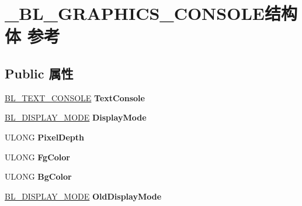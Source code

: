 \hypertarget{struct___b_l___g_r_a_p_h_i_c_s___c_o_n_s_o_l_e}{}\section{\+\_\+\+B\+L\+\_\+\+G\+R\+A\+P\+H\+I\+C\+S\+\_\+\+C\+O\+N\+S\+O\+L\+E结构体 参考}
\label{struct___b_l___g_r_a_p_h_i_c_s___c_o_n_s_o_l_e}
\subsection*{Public 属性}
\begin{DoxyCompactItemize}
\item 
\mbox{\label{struct___b_l___g_r_a_p_h_i_c_s___c_o_n_s_o_l_e_ad3e28a0970e0eb4021a84583652054cf}} 
\hyperlink{struct___b_l___t_e_x_t___c_o_n_s_o_l_e}{B\+L\+\_\+\+T\+E\+X\+T\+\_\+\+C\+O\+N\+S\+O\+LE} {\bfseries Text\+Console}
\item 
\mbox{\label{struct___b_l___g_r_a_p_h_i_c_s___c_o_n_s_o_l_e_ab17e5e54b0e17643a6024297a1b0a357}} 
\hyperlink{struct___b_l___d_i_s_p_l_a_y___m_o_d_e}{B\+L\+\_\+\+D\+I\+S\+P\+L\+A\+Y\+\_\+\+M\+O\+DE} {\bfseries Display\+Mode}
\item 
\mbox{\label{struct___b_l___g_r_a_p_h_i_c_s___c_o_n_s_o_l_e_ac15ce61adaae7df004f04d15349f134b}} 
U\+L\+O\+NG {\bfseries Pixel\+Depth}
\item 
\mbox{\label{struct___b_l___g_r_a_p_h_i_c_s___c_o_n_s_o_l_e_a21d3267d0b39e3cbce8ff10474aecfbf}} 
U\+L\+O\+NG {\bfseries Fg\+Color}
\item 
\mbox{\label{struct___b_l___g_r_a_p_h_i_c_s___c_o_n_s_o_l_e_abb792fa1a1810dcdbd4f42120e3e0534}} 
U\+L\+O\+NG {\bfseries Bg\+Color}
\item 
\mbox{\label{struct___b_l___g_r_a_p_h_i_c_s___c_o_n_s_o_l_e_a8c500cf608f385ab79b435bfdb0b0a8b}} 
\hyperlink{struct___b_l___d_i_s_p_l_a_y___m_o_d_e}{B\+L\+\_\+\+D\+I\+S\+P\+L\+A\+Y\+\_\+\+M\+O\+DE} {\bfseries Old\+Display\+Mode}

\end{DoxyCompactItemize}
